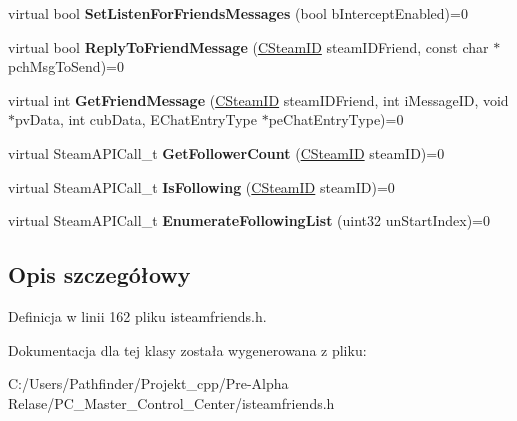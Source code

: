 \begin{DoxyCompactItemize}
virtual bool {\bfseries Set\+Listen\+For\+Friends\+Messages} (bool b\+Intercept\+Enabled)=0
\item 
\mbox{\label{class_i_steam_friends_a48a60a4d7a4277bbc573928717b6a13d}} 
virtual bool {\bfseries Reply\+To\+Friend\+Message} (\hyperlink{class_c_steam_i_d}{C\+Steam\+ID} steam\+I\+D\+Friend, const char $\ast$pch\+Msg\+To\+Send)=0
\item 
\mbox{\label{class_i_steam_friends_ada1434b498ff7e1a6cb320ca8ba78c05}} 
virtual int {\bfseries Get\+Friend\+Message} (\hyperlink{class_c_steam_i_d}{C\+Steam\+ID} steam\+I\+D\+Friend, int i\+Message\+ID, void $\ast$pv\+Data, int cub\+Data, E\+Chat\+Entry\+Type $\ast$pe\+Chat\+Entry\+Type)=0
\item 
\mbox{\label{class_i_steam_friends_a9f5c823932e64a147f2be3ed0b99638f}} 
virtual Steam\+A\+P\+I\+Call\+\_\+t {\bfseries Get\+Follower\+Count} (\hyperlink{class_c_steam_i_d}{C\+Steam\+ID} steam\+ID)=0
\item 
\mbox{\label{class_i_steam_friends_aeda9f2b90c4ccb21cfa5d63cf614aa2c}} 
virtual Steam\+A\+P\+I\+Call\+\_\+t {\bfseries Is\+Following} (\hyperlink{class_c_steam_i_d}{C\+Steam\+ID} steam\+ID)=0
\item 
\mbox{\label{class_i_steam_friends_a726945d52b0d104d81577a994c11e15d}} 
virtual Steam\+A\+P\+I\+Call\+\_\+t {\bfseries Enumerate\+Following\+List} (uint32 un\+Start\+Index)=0
\end{DoxyCompactItemize}


\subsection{Opis szczegółowy}


Definicja w linii 162 pliku isteamfriends.\+h.



Dokumentacja dla tej klasy została wygenerowana z pliku\+:\begin{DoxyCompactItemize}
\item 
C\+:/\+Users/\+Pathfinder/\+Projekt\+\_\+cpp/\+Pre-\/\+Alpha Relase/\+P\+C\+\_\+\+Master\+\_\+\+Control\+\_\+\+Center/isteamfriends.\+h\end{DoxyCompactItemize}

